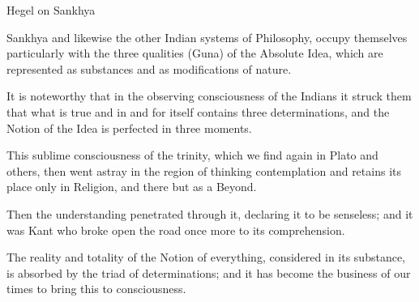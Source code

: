 Hegel on Sankhya

Sankhya and likewise the other Indian systems of Philosophy,
occupy themselves particularly with the three qualities (Guna)
of the Absolute Idea, which are represented as substances
and as modifications of nature.

It is noteworthy that in the observing consciousness of the Indians
it struck them that what is true and in and for itself
contains three determinations,
and the Notion of the Idea is perfected in three moments.

This sublime consciousness of the trinity,
which we find again in Plato and others,
then went astray in the region of thinking contemplation
and retains its place only in Religion,
and there but as a Beyond.

Then the understanding penetrated through it,
declaring it to be senseless;
and it was Kant who broke open the road once more
to its comprehension.

The reality and totality of the Notion of everything,
considered in its substance, is absorbed by
the triad of determinations;
and it has become the business of our times
to bring this to consciousness.
